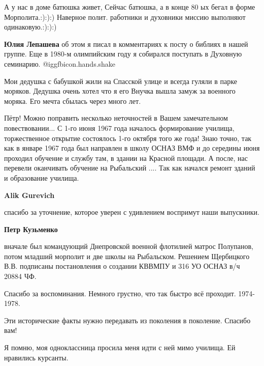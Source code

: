 \begin{itemize}

А у нас в доме батюшка живет, Сейчас батюшка, а в конце 80 ых бегал в форме
Морполита.:):):) Наверное полит. работники и духовники миссию выполняют
одинаковую.:):):)

\begin{itemize} %
\textbf{Юлия Лепашева} об этом я писал в комментариях к посту о библиях в нашей группе. Еще в 1980-м олимпийским году я собирался поступать в Духовную семинарию.  @igg{fbicon.hands.shake} 
\end{itemize} %


Мои дедушка с бабушкой жили на Спасской улице и всегда гуляли в парке моряков.
Дедушка очень хотел что я его Внучка вышла замуж за военного моряка. Его мечта
сбылась через много лет.


Пётр! Можно поправить несколько неточностей в Вашем замечательном
повествовании... С 1-го июня 1967 года началось формирование училища,
торжественное открытие состоялось 1-го октября того же года! Знаю точно, так
как в январе 1967 года был направлен в школу ОСНАЗ ВМФ и до середины июня
проходил обучение и службу там, в здании на Красной площади. А после, нас
перевели оканчивать обучение на Рыбальский .... Так как начался ремонт зданий и
образование училища.

\begin{itemize} %
\textbf{Alik Gurevich} 

спасибо за уточнение, которое уверен с удивлением воспримут наши выпускники.

\textbf{Петр Кузьменко} 

вначале был командующий Днепровской военной флотилией матрос Полупанов, потом
младший морполит и две школы на Рыбальском. Решением Щербицкого В.В. подписаны
постановления о создании КВВМПУ и 316 УО ОСНАЗ в/ч 20884 ЧФ.

\end{itemize} %

Спасибо за воспоминания. Немного грустно, что так быстро всё проходит. 1974-1978.

Эти исторические факты нужно передавать из поколения в поколение. Спасибо вам!

Я помню, моя одноклассница просила меня идти с ней мимо училища. Ей нравились курсанты.


\end{itemize}
